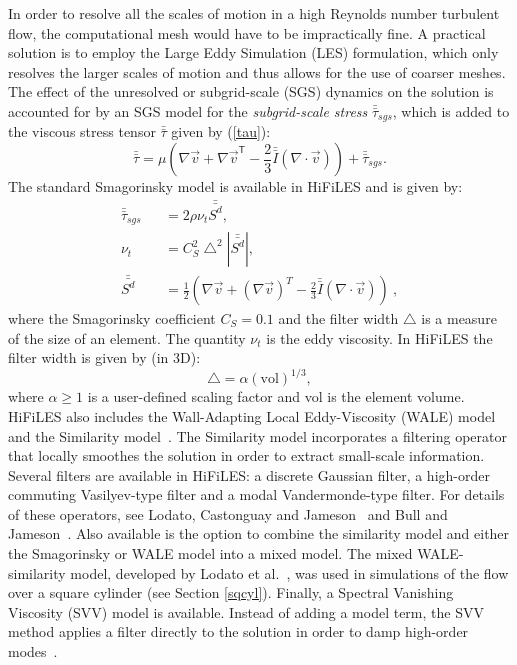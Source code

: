 In order to resolve all the scales of motion in a high Reynolds number turbulent flow, the computational mesh would have to be impractically fine.
A practical solution is to employ the Large Eddy Simulation (LES) formulation, which only resolves the larger scales of motion and thus allows for the use of coarser meshes.
The effect of the unresolved or subgrid-scale (SGS) dynamics on the solution is accounted for by an SGS model for the \emph{subgrid-scale stress} $\bar{\bar{\tau}}_{sgs}$, which is added to the viscous stress tensor $\bar{\bar{\tau}}$ given by (\ref{tau}):
%
\begin{equation}\label{tausgs}
\bar{\bar{\tau}} = \mu \left ( \nabla \vec{v} + {\nabla \vec{v}}^\mathsf{T}  - \frac{2}{3} \bar{\bar{I}} (\nabla \cdot \vec{v} ) \right ) + \bar{\bar{\tau}}_{sgs}.
\end{equation}
%
The standard Smagorinsky model is available in HiFiLES and is given by:
%
\begin{eqnarray}\label{smag}
\bar{\bar{\tau}}_{sgs} &&= 2 \rho \nu_t \bar{\bar{S^d}}, \\
\nu_t &&= C_S^2 \bigtriangleup^2 | \bar{\bar{S^d}} |,\\
\bar{\bar{S^d}} &&= \frac 1 2 \left (\nabla \vec v + (\nabla \vec v)^T - \frac 2 3 \bar{\bar{I}} (\nabla \cdot \vec{v} ) \right )\ ,
\end{eqnarray}
%
where the Smagorinsky coefficient $C_S = 0.1$ and the filter width $\bigtriangleup$ is a measure of the size of an element.
The quantity $\nu_t$ is the eddy viscosity.
In HiFiLES the filter width is given by (in 3D):
%
\begin{equation}
\bigtriangleup = \alpha (\text{vol})^{1/3},
\end{equation}
%
where $\alpha \geq 1$ is a user-defined scaling factor and vol is the element volume.
HiFiLES also includes the Wall-Adapting Local Eddy-Viscosity (WALE) model~\cite{nicoud1999} and the Similarity model~\cite{bardina1980}.
The Similarity model incorporates a filtering operator that locally smoothes the solution in order to extract small-scale information.
Several filters are available in HiFiLES: a discrete Gaussian filter, a high-order commuting Vasilyev-type filter and a modal Vandermonde-type filter.
For details of these operators, see Lodato, Castonguay and Jameson~\cite{lodato2012b} and Bull and Jameson~\cite{bull2013a}.
Also available is the option to combine the similarity model and either the Smagorinsky or WALE model into a mixed model.
The mixed WALE-similarity model, developed by Lodato et al.~\cite{lodato2009}, was used in simulations of the flow over a square cylinder (see Section \ref{sqcyl}).
Finally, a Spectral Vanishing Viscosity (SVV) model is available.
Instead of adding a model term, the SVV method applies a filter directly to the solution in order to damp high-order modes~\cite{karamanos2000}.

